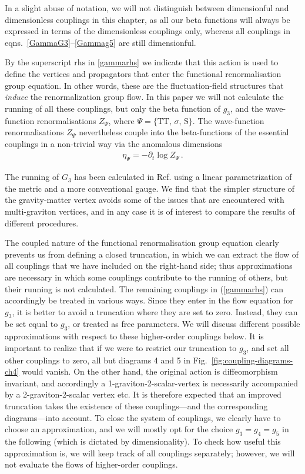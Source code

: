 \documentclass[11pt]{book} %
\numberwithin{equation}{chapter}
\begin{document}
In a slight abuse of notation, we will not distinguish between dimensionful and dimensionless couplings in
this chapter,
as all our beta functions will always be expressed in terms of the dimensionless couplings only,
whereas all couplings in eqns.~\eqref{GammaG3}--\eqref{Gammag5} are still dimensionful.

By the superscript $\mathrm{rhs}$ in \eqref{gammarhs} we indicate that this action is used to define the
vertices and propagators that enter the functional renormalisation group equation.
In other words, these are the fluctuation-field structures that \emph{induce} the renormalization group flow.
In this paper we will not calculate the running of all these couplings, but only the beta function
of $g_3$, and the wave-function renormalisations $Z_\Psi$, where $\Psi = \{ \mathrm{TT}, \, \sigma, \, \mathrm S \}$.
The wave-function renormalisations $Z_\Psi$ nevertheless couple into the beta-functions of the
essential couplings in a non-trivial way via the anomalous dimensions
\begin{align}
  \eta_\Psi = - \partial_t \log Z_\Psi \,.
\end{align}

The running of $G_3$ has been calculated in Ref. \cite{Meibohm:2015twa} using a linear
parametrization of the metric and a more conventional gauge.
We find that the simpler structure of the gravity-matter vertex avoids some of the issues that
are encountered with multi-graviton vertices,
and in any case it is of interest to compare the results of different procedures.

The coupled nature of the functional renormalisation group equation clearly prevents
us from defining a closed truncation,
in which we can extract the flow of all couplings that we have included on the right-hand side;
thus approximations are necessary in which some couplings contribute to the running of others,
but their running is not calculated.
The remaining couplings in (\ref{gammarhs}) can accordingly be treated in various ways.
Since they enter in the flow equation for $g_3$,
it is better to avoid a truncation where they are set to zero.
Instead, they can be set equal to $g_3$, or treated as free parameters.
We will discuss different possible approximations with respect to these higher-order couplings below.
It is important to realize that if we were to restrict our truncation to $g_3$,
and set all other couplings to zero,
all but diagrams 4 and 5 in Fig.~\ref{fig:coupling-diagrams-ch4} would vanish.
On the other hand, the original action is diffeomorphism invariant,
and accordingly a 1-graviton-2-scalar-vertex is necessarily accompanied by a 2-graviton-2-scalar vertex etc.
It is therefore expected that an improved truncation takes the existence of these couplings---and
the corresponding diagrams---into account.
To close the system of couplings, we clearly have to choose an approximation,
and we will mostly opt for the choice $g_3=g_4=g_5$ in the following
(which is dictated by dimensionality). To check how useful this approximation is,
we will keep track of all couplings separately;
however, we will not evaluate the flows of higher-order couplings.
\end{document}
